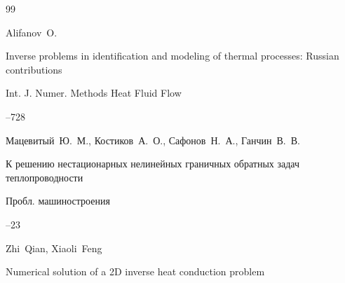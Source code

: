 \begin{thebibliography}{99}










\by Alifanov~O.

\paper Inverse problems in identification and modeling of thermal processes: Russian contributions

\jour  Int. J. Numer. Methods Heat Fluid Flow



--728





\by Мацевитый~Ю.~М., Костиков~А.~О., Сафонов~Н.~А., Ганчин~В.~В.

\paper К решению нестационарных нелинейных граничных обратных задач теплопроводности

\jour Пробл. машиностроения




--23














\by Zhi~Qian, Xiaoli~Feng

\paper Numerical solution of a 2D inverse heat conduction problem


\end{thebibliography}
